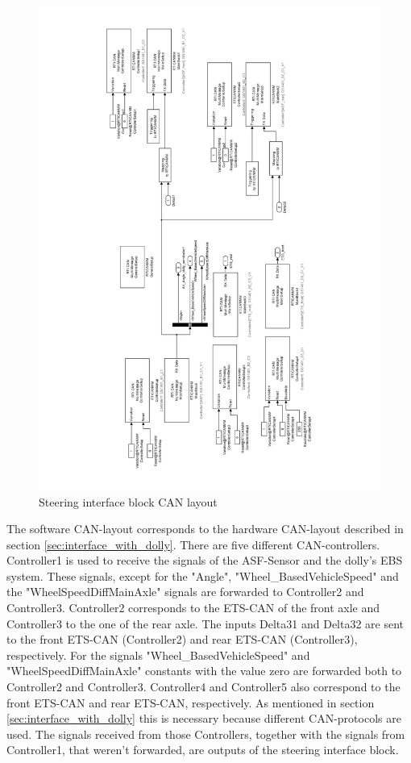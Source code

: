 \documentclass[ExampleMasters.tex]{subfiles}
\begin{document}
 \begin{figure}[!htb]
 	\centering
 	\includegraphics[width=0.95\linewidth]{figures/steering_interface_inside}
 	
 	\caption[Steering interface block \acrshort{CAN} layout]{Steering interface block \gls{CAN} layout}
 	\label{fig:steering_interface_inside_pdf}
 \end{figure}
 
 The software CAN-layout corresponds to the hardware CAN-layout described in section \ref{sec:interface_with_dolly}. There are five different CAN-controllers. Controller1 is used to receive the signals of the ASF-Sensor and the dolly's \gls{EBS} system. These signals, except for the "Angle", "Wheel\_BasedVehicleSpeed" and the "WheelSpeedDiffMainAxle" signals are forwarded to Controller2 and Controller3. Controller2 corresponds to the \gls{ETS}-\gls{CAN} of the front axle and Controller3 to the one of the rear axle. The inputs Delta31 and Delta32 are sent to the front \gls{ETS}-\gls{CAN} (Controller2) and rear \gls{ETS}-\gls{CAN} (Controller3), respectively. For the signals "Wheel\_BasedVehicleSpeed" and  "WheelSpeedDiffMainAxle" constants with the value zero are forwarded both to Controller2 and Controller3.
 Controller4 and Controller5 also correspond to the front \gls{ETS}-\gls{CAN} and rear \gls{ETS}-\gls{CAN}, respectively. As mentioned in section \ref{sec:interface_with_dolly} this is necessary because different CAN-protocols are used. The signals received from those Controllers, together with the signals from Controller1, that weren't forwarded, are outputs of the steering interface block.
  
\end{document}
